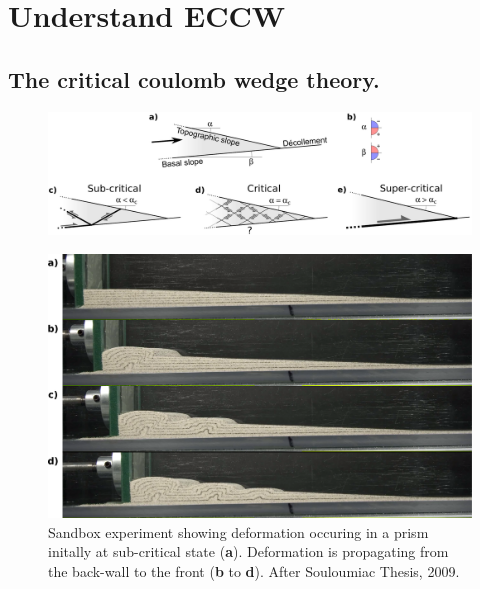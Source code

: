\documentclass[a4paper]{scrartcl}
\begin{document}
\newpage
\section{Understand ECCW}
\label{sec:understand_ECCW}

\subsection{The critical coulomb wedge theory.}

\begin{figure}[h]
	\centering
	\includegraphics[width=14cm]{Dahlen-geometry.pdf}
	\caption{}
	\label{fig:example_section-ext}
\end{figure}

\begin{figure}[p]
	\includegraphics[width=15cm]{Sandbox-subcritical.pdf} 
	\caption{Sandbox experiment showing deformation occuring in a prism initally at sub-critical state (\textbf{a}). Deformation is propagating from the back-wall to the front (\textbf{b} to \textbf{d}). After Souloumiac Thesis, 2009.}
	\label{fig:subcritical}
\end{figure}
\end{document}

